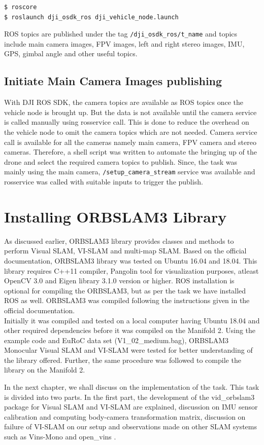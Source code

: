 \begin{lstlisting}[language=bash, basicstyle=\small]
$ roscore
$ roslaunch dji_osdk_ros dji_vehicle_node.launch
\end{lstlisting} 

ROS topics are published under the tag \texttt{/dji\_osdk\_ros/t\_name} and topics include main camera images, FPV images, left and right stereo images, IMU, GPS, gimbal angle and other useful topics.

\subsection*{Initiate Main Camera Images publishing}
\label{subsec:settingupmanifold:inititecamera}
With DJI ROS SDK, the camera topics are available as ROS topics once the vehicle node is brought up. But the data is not available until the camera service is called manually using rosservice call. This is done to reduce the overhead on the vehicle node to omit the camera topics which are not needed. Camera service call is available for all the cameras namely main camera, FPV camera and stereo cameras. Therefore, a shell script was written to automate the bringing up of the drone and select the required camera topics to publish.
Since, the task was mainly using the main camera, \texttt{/setup\_camera\_stream} service was available and rosservice was called with suitable inputs to trigger the publish.

\section{Installing ORBSLAM3 Library}
\label{sec:concept:orbslam3lib}
As discussed earlier, ORBSLAM3 library provides classes and methods to perform Visual SLAM, VI-SLAM and multi-map SLAM. Based on the official documentation, ORBSLAM3 library was tested on Ubuntu 16.04 and 18.04. This library requires C++11 compiler, Pangolin tool for visualization purposes, atleast OpenCV 3.0 and Eigen library 3.1.0 version or higher. ROS installation is optional for compiling the ORBSLAM3, but as per the task we have installed ROS as well. ORBSLAM3 was compiled following the instructions given in the official documentation. \\

Initially it was compiled and tested on a local computer having Ubuntu 18.04 and other required dependencies before it was compiled on the Manifold 2. Using the example code and EuRoC data set \cite{Burri25012016} (V1\_02\_medium.bag), ORBSLAM3 Monocular Visual SLAM and VI-SLAM were tested for better understanding of the library offered. Further, the same procedure was followed to compile the library on the Manifold 2. 

\vspace{1cm}
In the next chapter, we shall discuss on the implementation of the task. This task is divided into two parts. In the first part, the development of the vid\_orbslam3 package for Visual SLAM and VI-SLAM are explained, discussion on IMU sensor calibration and computing body-camera transformation matrix, discussion on failure of VI-SLAM on our setup and observations made on other SLAM systems such as Vins-Mono \cite{qin2017vins} and open\_vins \cite{Geneva2020ICRA}.
